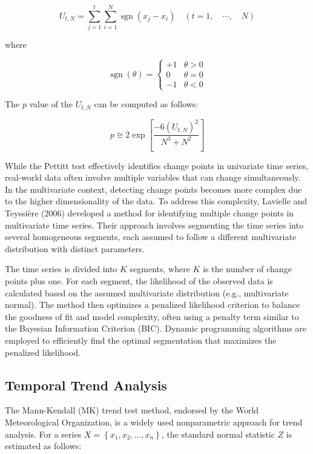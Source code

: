 \documentclass[
]{krantz}
\begin{document}
\[
U_{t, N}=\sum_{j=1}^{t} \sum_{i=1}^{N} \operatorname{sgn}\left(x_{j}-x_{i}\right) \quad (t=1, \quad \cdots, \quad N) \tag{2}
\]

where

\[
\operatorname{sgn}(\theta)=\left\{\begin{array}{rc}
+1 & \theta>0 \\
0 & \theta=0 \\
-1 & \theta<0
\end{array}\right.
\]

The \(p\) value of the \(U_{t, N}\) can be computed as follows:

\[
p \cong 2 \exp \left[\frac{-6\left(U_{t, N}\right)^{2}}{N^{3}+N^{2}}\right]
\]

While the Pettitt test effectively identifies change points in univariate time series, real-world data often involve multiple variables that can change simultaneously. In the multivariate context, detecting change points becomes more complex due to the higher dimensionality of the data. To address this complexity, Lavielle and Teyssière (2006) developed a method for identifying multiple change points in multivariate time series. Their approach involves segmenting the time series into several homogeneous segments, each assumed to follow a different multivariate distribution with distinct parameters.

The time series is divided into \(K\) segments, where \(K\) is the number of change points plus one. For each segment, the likelihood of the observed data is calculated based on the assumed multivariate distribution (e.g., multivariate normal). The method then optimizes a penalized likelihood criterion to balance the goodness of fit and model complexity, often using a penalty term similar to the Bayesian Information Criterion (BIC). Dynamic programming algorithms are employed to efficiently find the optimal segmentation that maximizes the penalized likelihood.

\subsection{Temporal Trend Analysis}\label{temporal-trend-analysis}

The Mann-Kendall (MK) trend test method, endorsed by the World Meteorological Organization, is a widely used nonparametric approach for trend analysis. For a series \(X=\left\{x_{1}, x_{2}, \ldots, x_{n}\right\}\), the standard normal statistic \(Z\) is estimated as follows:
\end{document}

